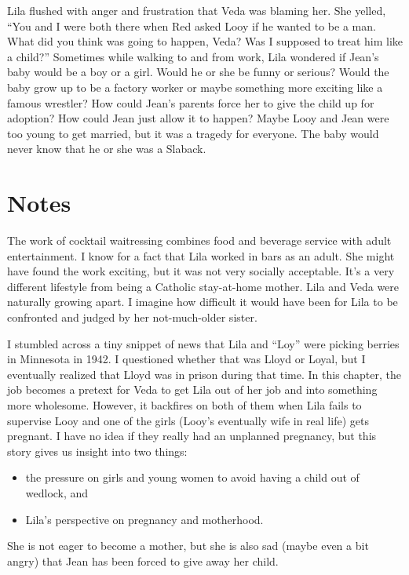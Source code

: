\documentclass[
  american,
  letterpaper,
]{book}
\providecommand{\tightlist}{%
  \setlength{\itemsep}{0pt}\setlength{\parskip}{0pt}}\usepackage{longtable,booktabs,array}
\begin{document}
Lila flushed with anger and frustration that Veda was blaming her. She
yelled, ``You and I were both there when Red asked Looy if he wanted to
be a man. What did you think was going to happen, Veda? Was I supposed
to treat him like a child?'' Sometimes while walking to and from work,
Lila wondered if Jean's baby would be a boy or a girl. Would he or she
be funny or serious? Would the baby grow up to be a factory worker or
maybe something more exciting like a famous wrestler? How could Jean's
parents force her to give the child up for adoption? How could Jean just
allow it to happen? Maybe Looy and Jean were too young to get married,
but it was a tragedy for everyone. The baby would never know that he or
she was a Slaback.

\section{Notes}\label{notes-29}

The work of cocktail waitressing combines food and beverage service with
adult entertainment. I know for a fact that Lila worked in bars as an
adult. She might have found the work exciting, but it was not very
socially acceptable. It's a very different lifestyle from being a
Catholic stay-at-home mother. Lila and Veda were naturally growing
apart. I imagine how difficult it would have been for Lila to be
confronted and judged by her not-much-older sister.

I stumbled across a tiny snippet of news that Lila and ``Loy'' were
picking berries in Minnesota in 1942. I questioned whether that was
Lloyd or Loyal, but I eventually realized that Lloyd was in prison
during that time. In this chapter, the job becomes a pretext for Veda to
get Lila out of her job and into something more wholesome. However, it
backfires on both of them when Lila fails to supervise Looy and one of
the girls (Looy's eventually wife in real life) gets pregnant. I have no
idea if they really had an unplanned pregnancy, but this story gives us
insight into two things:

\begin{itemize}
\tightlist
\item
  the pressure on girls and young women to avoid having a child out of
  wedlock, and
\item
  Lila's perspective on pregnancy and motherhood.
\end{itemize}

She is not eager to become a mother, but she is also sad (maybe even a
bit angry) that Jean has been forced to give away her child.
\end{document}
